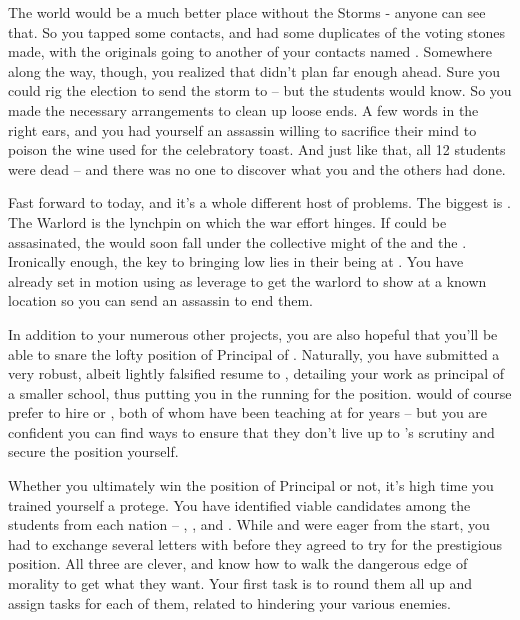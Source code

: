 \documentclass[char]{GL2020}
\begin{document}
The world would be a much better place without the Storms - anyone can see that. So you tapped some contacts, and had some duplicates of the voting stones made, with the originals going to another of your \pTech{} contacts named \cHeadScientist{}. Somewhere along the way, though, you realized that \cDiplomat{} didn’t plan far enough ahead. Sure you could rig the election to send the storm to \pShip{} -- but the students would know. So you made the necessary arrangements to clean up loose ends. A few words in the right ears, and you had yourself an assassin willing to sacrifice their mind to poison the wine used for the celebratory toast. And just like that, all 12 students were dead -- and there was no one to discover what you and the others had done.

Fast forward to today, and it's a whole different host of problems. The biggest is \cLoud{\full}. The Warlord is the lynchpin on which the \pShip{} war effort hinges. If \cLoud{\they} could be assasinated, the \pShip{} would soon fall under the collective might of the \pFarm{} and the \pTech{}. Ironically enough, the key to bringing \cLoud{} low lies in their \cWarlordDaughter{\child} being at \pSchool{}. You have already set in motion using \cWarlordDaughter{\them} as leverage to get the warlord to show \cLoud{\themself} at a known location so you can send an assassin to end them.

In addition to your numerous other projects, you are also hopeful that you’ll be able to snare the lofty position of Principal of \pSchool{}.  Naturally, you have submitted a very robust, albeit lightly falsified resume to \cPrincipal{}, detailing your work as principal of a smaller school, thus putting you in the running for the position. \cPrincipal{} would of course prefer to hire \cMusic{} or \cBeetle{}, both of whom have been teaching at \pSc{} for years -- but you are confident you can find ways to ensure that they don’t live up to \cPrincipal{}’s scrutiny and secure the position yourself.

Whether you ultimately win the position of Principal or not, it’s high time you trained yourself a protege. You have identified viable candidates among the students from each nation -- \cPirateChild{}, \cLibAssist{}, and \cAmbition{}. While \cLibAssist{} and \cAmbition{} were eager from the start, you had to exchange several letters with \cPirateChild{} before they agreed to try for the prestigious position. All three are clever, and know how to walk the dangerous edge of morality to get what they want. Your first task is to round them all up and assign tasks for each of them, related to hindering your various enemies.
\end{document}
